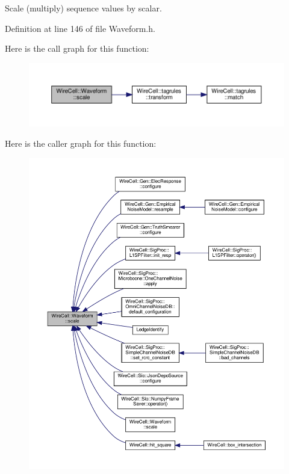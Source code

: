 Scale (multiply) sequence values by scalar. 



Definition at line 146 of file Waveform.\+h.

Here is the call graph for this function\+:
\nopagebreak
\begin{figure}[H]
\begin{center}
\leavevmode
\includegraphics[width=350pt]{namespace_wire_cell_1_1_waveform_aa8d25ae88346929b5e54cd116f7a4f47_cgraph}
\end{center}
\end{figure}
Here is the caller graph for this function\+:
\nopagebreak
\begin{figure}[H]
\begin{center}
\leavevmode
\includegraphics[width=350pt]{namespace_wire_cell_1_1_waveform_aa8d25ae88346929b5e54cd116f7a4f47_icgraph}
\end{center}
\end{figure}
\mbox{\label{namespace_wire_cell_1_1_waveform_a3278b47bbecdbb8a663286d9cdec0d75}} 
